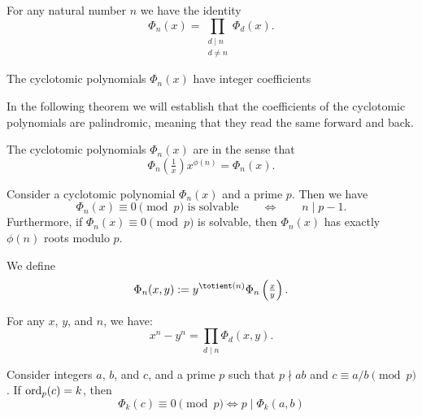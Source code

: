\begin{theorem}
  For any natural number $n$ we have the identity
  \begin{equation*}
    \Phi_n(x)=\prod_{\substack{d\mid n\\[2pt]d\neq n}}\Phi_d(x).
  \end{equation*}
\end{theorem}

\begin{theorem}
  The cyclotomic polynomials $\Phi_n(x)$ have integer coefficients
\end{theorem}

In the following theorem we will establish that the coefficients of the cyclotomic polynomials are palindromic, meaning that they read the same forward and back. 

\begin{theorem}
  The cyclotomic polynomials $\Phi_n(x)$ are  in the sense that
  \begin{equation*}
    \Phi_n\left(\tfrac{1}{x}\right)x^{\phi(n)} = \Phi_n(x).
  \end{equation*}
\end{theorem}

\begin{theorem}
  Consider a cyclotomic polynomial $\Phi_n(x)$ and a prime $p$. Then we have
  \begin{equation*}
    \Phi_n(x)\equiv 0\pmod{p}\text{ is solvable}\qquad\Leftrightarrow\qquad n\mid p-1.
  \end{equation*}
  Furthermore, if $\Phi_n(x)\equiv 0\pmod{p}$ is solvable, then $\Phi_n(x)$ has exactly $\phi(n)$ roots modulo $p$.
\end{theorem}

\begin{definition}
  We define
  \begin{equation*}
    \Phi_n(x,y):= y^{\totient(n)}\Phi_n\left(\tfrac{x}{y}\right).
  \end{equation*}
\end{definition}

\begin{proposition}
  For any $x$, $y$, and $n$, we have:
  \begin{equation*}
    x^n-y^n=\prod_{d\mid n}\Phi_d(x,y).
  \end{equation*}
\end{proposition}

\begin{lemma}
  Consider integers $a$, $b$, and $c$, and a prime $p$ such that $p\nmid ab$ and $c\equiv a/b\pmod{p}$. If $\operatorname{ord}_p(c)=k$, then
  \begin{equation*}
    \Phi_k(c)\equiv 0\pmod{p} \Leftrightarrow p\mid \Phi_k(a,b)
  \end{equation*}
\end{lemma}

